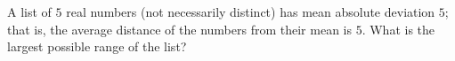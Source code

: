 A list of $5$ real numbers (not necessarily distinct) has mean absolute deviation $5$; that is, the average distance of the numbers from their mean is $5$. What is the largest possible range of the list?
